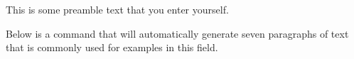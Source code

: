 \documentclass{article}
\begin{document}
This is some preamble text that you enter yourself.

Below is a command that will automatically generate seven paragraphs
of text that is commonly used for examples in this field.

\lipsum[1-7]
\end{document}
